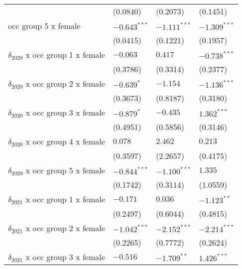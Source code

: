 \begin{tabular}{llll}
                                       &           (0.0840) &           (0.2073) &           (0.1451) \\
occ group 5 x female                   &     $-0.643^{***}$ &     $-1.111^{***}$ &     $-1.309^{***}$ \\
                                       &           (0.0415) &           (0.1221) &           (0.1957) \\
$\delta_{2020}$ x occ group 1 x female &           $-0.063$ &            $0.417$ &     $-0.738^{***}$ \\
                                       &           (0.3786) &           (0.3314) &           (0.2377) \\
$\delta_{2020}$ x occ group 2 x female &         $-0.639^*$ &           $-1.154$ &     $-1.136^{***}$ \\
                                       &           (0.3673) &           (0.8187) &           (0.3180) \\
$\delta_{2020}$ x occ group 3 x female &         $-0.879^*$ &           $-0.435$ &      $1.362^{***}$ \\
                                       &           (0.4951) &           (0.5856) &           (0.3146) \\
$\delta_{2020}$ x occ group 4 x female &            $0.078$ &            $2.462$ &            $0.213$ \\
                                       &           (0.3597) &           (2.2657) &           (0.4175) \\
$\delta_{2020}$ x occ group 5 x female &     $-0.844^{***}$ &     $-1.100^{***}$ &            $1.335$ \\
                                       &           (0.1742) &           (0.3114) &           (1.0559) \\
$\delta_{2021}$ x occ group 1 x female &           $-0.171$ &            $0.036$ &      $-1.123^{**}$ \\
                                       &           (0.2497) &           (0.6044) &           (0.4815) \\
$\delta_{2021}$ x occ group 2 x female &     $-1.042^{***}$ &     $-2.152^{***}$ &     $-2.214^{***}$ \\
                                       &           (0.2265) &           (0.7772) &           (0.2624) \\
$\delta_{2021}$ x occ group 3 x female &           $-0.516$ &      $-1.709^{**}$ &      $1.426^{***}$ \\

\end{tabular}
